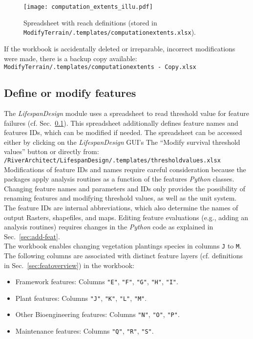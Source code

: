 \begin{figure}[hbt]
	\begin{center}
	\texttt{[image: computation\_extents\_illu.pdf]} %
	\caption{Spreadsheet with reach definitions (stored in \texttt{ModifyTerrain/.templates/computation{\myUnderscore}extents.xlsx}). \label{fig:illu_reaches}}
	\end{center}
\end{figure}

If the workbook is accidentally deleted or irreparable, incorrect modifications were made, there is a backup copy available:\\
\texttt{ModifyTerrain/.templates/computation{\myUnderscore}extents - Copy.xlsx}

\subsection{Define or modify features} \label{sec:modfeat}
The \textit{LifespanDesign} module uses a spreadsheet to read threshold value for feature failures (cf. Sec.~\ref{sec:modfeat}). This spreadsheet additionally defines feature names and features IDs, which can be modified if needed. The spreadsheet can be accessed either by clicking on the \textit{LifespanDesign} GUI's The ``Modify survival threshold values'' button or directly from:\\
\texttt{/RiverArchitect/LifespanDesign/.templates/threshold{\myUnderscore}values.xlsx}\\

Modifications of feature IDs and names require careful consideration because the packages apply analysis routines as a function of the features \textit{Python} classes. Changing feature names and parameters and IDs only provides the possibility of renaming features and modifying threshold values, as well as the unit system. The feature IDs are internal abbreviations, which also determine the names of output Rasters, shapefiles, and maps. Editing feature evaluations (e.g., adding an analysis routines) requires changes in the \textit{Python} code as explained in Sec.~\ref{sec:add-feat}.\\
The workbook enables changing vegetation plantings species in columns \texttt{J} to \texttt{M}. The following columns are associated with distinct feature layers (cf. definitions in Sec.~\ref{sec:featoverview}) in the workbook:
\begin{itemize}
	\item Framework features: Columns \texttt{"E"}, \texttt{"F"}, \texttt{"G"}, \texttt{"H"}, \texttt{"I"}.
	\item Plant features: Columns \texttt{"J"}, \texttt{"K"}, \texttt{"L"}, \texttt{"M"}.
	\item Other Bioengineering features: Columns \texttt{"N"}, \texttt{"O"}, \texttt{"P"}.
	\item Maintenance features: Columns \texttt{"Q"}, \texttt{"R"}, \texttt{"S"}.
\end{itemize}

